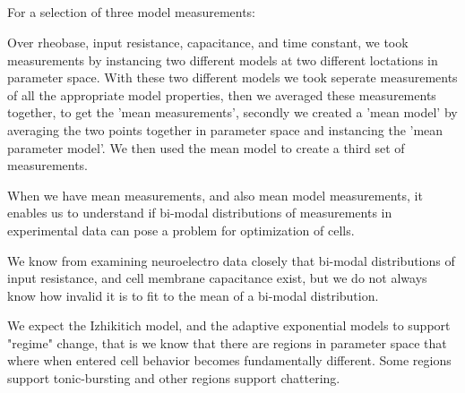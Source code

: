 \subsection{}
For a selection of three model measurements:

Over rheobase, input resistance, capacitance, and time constant, we took measurements by instancing two different models at  two different loctations in parameter space. With these two different models we took seperate measurements of all the appropriate model properties, then we averaged these measurements together, to get the 'mean measurements', secondly we created a 'mean model' by averaging the two points together in parameter space and instancing the 'mean parameter model'. We then used the mean model to create a third set of measurements.

When we have mean measurements, and also mean model measurements, it enables us to understand if bi-modal distributions of measurements in experimental data can pose a problem for optimization of cells.

We know from examining neuroelectro data closely that bi-modal distributions of input resistance, and cell membrane capacitance exist, but we do not always know how invalid it is to fit to the mean of a bi-modal distribution.

We expect the Izhikitich model, and the adaptive exponential models to support "regime" change, that is we know that there are regions in parameter space that where when entered cell behavior becomes fundamentally different. Some regions support tonic-bursting and other regions support chattering.